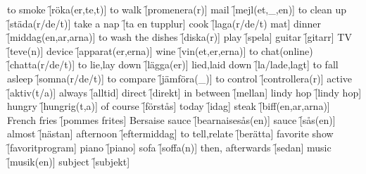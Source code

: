 \begin{questions}
\begin{multicols}{2}
        \question to smoke \f[röka(er,te,t)]
        \question to walk \f[promenera(r)]
        \question mail \f[mejl(et,\_,en)]
        \question to clean up \f[städa(r/de/t)]
        \question take a nap \f[ta en tupplur]
        \question cook \f[laga(r/de/t) mat]
        \question dinner \f[middag(en,ar,arna)]
        \question to wash the dishes \f[diska(r)]
        \question play \f[spela]
        \question guitar \f[gitarr]
        \question TV \f[teve(n)]
        \question device \f[apparat(er,erna)]
        \question wine \f[vin(et,er,erna)]
        \question to chat(online) \f[chatta(r/de/t)]
        \question to lie,lay down \f[lägga(er)]
        \question lied,laid down \f[la/lade,lagt]
        \question to fall asleep \f[somna(r/de/t)]
        \question to compare \f[jämföra(\_)]
        \question to control \f[controllera(r)]
        \question active \f[aktiv(t/a)]
        \question always \f[alltid]
        \question direct \f[direkt]
        \question in between \f[mellan]
        \question lindy hop \f[lindy hop]
        \question hungry \f[hungrig(t,a)]
        \question of course \f[förstås]
        \question today \f[idag]
        \question steak \f[biff(en,ar,arna)]
        \question French fries \f[pommes frites]
        \question Bersaise sauce \f[bearnaisesås(en)]
        \question sauce \f[sås(en)]
        \question almost \f[nästan]
        \question afternoon \f[eftermiddag]
        \question to tell,relate \f[berätta]
        \question favorite show \f[favoritprogram]
        \question piano \f[piano]
        \question sofa \f[soffa(n)]
        \question then, afterwards \f[sedan]
        \question music \f[musik(en)]
        \question subject \f[subjekt]
    \end{multicols}
\end{questions}
